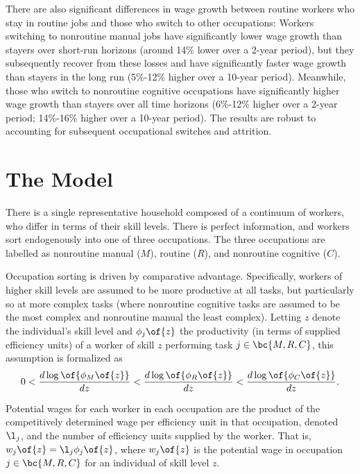 \documentclass[12pt]{article}
\theoremstyle{definition}
\begin{document}
There are also significant differences in wage growth between routine workers who stay in routine jobs and those who switch to other occupations: Workers switching to nonroutine manual jobs have significantly lower wage growth than stayers over short-run horizons (around 14\% lower over a 2-year period), but they subsequently recover from these losses and have significantly faster wage growth than stayers in the long run (5\%-12\% higher over a 10-year period). Meanwhile, those who switch to nonroutine cognitive occupations have significantly higher wage growth than stayers over all time horizons (6\%-12\% higher over a 2-year period; 14\%-16\% higher over a 10-year period). The results are robust to accounting for subsequent occupational switches and attrition.


\section{The Model}

There is a single representative household composed of a continuum of workers, who differ in terms of their skill levels. There is perfect information, and workers sort endogenously into one of three occupations. The three occupations are labelled as nonroutine manual ($M$), routine ($R$), and nonroutine cognitive ($C$).

Occupation sorting is driven by comparative advantage. Specifically, workers of higher skill levels are assumed to be more productive at all tasks, but particularly so at more complex tasks (where nonroutine cognitive tasks are assumed to be the most complex and nonroutine manual the least complex). Letting $z$ denote the individual's skill level and $\phi_j\of{z}$ the productivity (in terms of supplied efficiency units) of a worker of skill $z$ performing task $j \in \bc{M, R, C}$, this assumption is formalized as 
\begin{equation}
    \notag
    0 < \frac{d \log\of{\phi_M\of{z}}}{d z} < \frac{d \log\of{\phi_R\of{z}}}{d z} < \frac{d \log\of{\phi_C\of{z}}}{d z}.
\end{equation}

Potential wages for each worker in each occupation are the product of the competitively determined wage per efficiency unit in that occupation, denoted $\l_j$, and the number of efficiency units supplied by the worker. That is, $w_j\of{z} = \l_j \phi_j\of{z}$, where $w_j\of{z}$ is the potential wage in occupation $j \in \bc{M, R, C}$ for an individual of skill level $z$.
\end{document}

